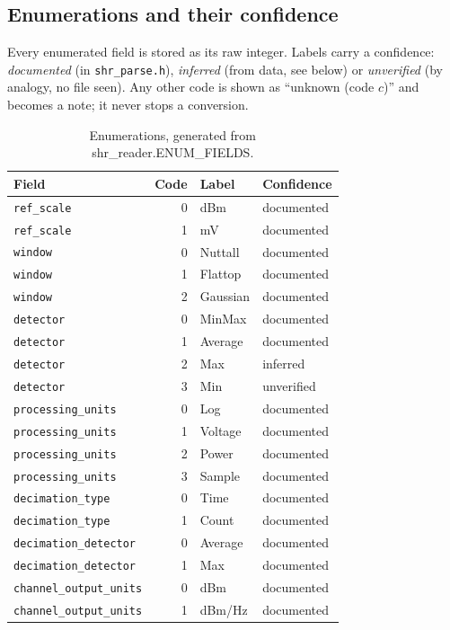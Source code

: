 \documentclass[11pt,a4paper]{article}
\newcommand{\code}[1]{\texttt{#1}}
\begin{document}
\subsection{Enumerations and their confidence}
Every enumerated field is stored as its raw integer. Labels carry a confidence: \emph{documented} (in
\code{shr\_parse.h}), \emph{inferred} (from data, see below) or \emph{unverified} (by analogy, no file seen).
Any other code is shown as ``unknown (code $c$)'' and becomes a note; it never stops a conversion.
\begin{longtable}{p{4.2cm}rp{4.4cm}l}
\caption{Enumerations, generated from shr\_reader.ENUM\_FIELDS.}\\
\toprule
\textbf{Field} & \textbf{Code} & \textbf{Label} & \textbf{Confidence}\\
\midrule
\endhead
\texttt{ref\_\allowbreak{}scale} & 0 & dBm & documented\\
\texttt{ref\_\allowbreak{}scale} & 1 & mV & documented\\
\texttt{window} & 0 & Nuttall & documented\\
\texttt{window} & 1 & Flattop & documented\\
\texttt{window} & 2 & Gaussian & documented\\
\texttt{detector} & 0 & MinMax & documented\\
\texttt{detector} & 1 & Average & documented\\
\texttt{detector} & 2 & Max & inferred\\
\texttt{detector} & 3 & Min & unverified\\
\texttt{processing\_\allowbreak{}units} & 0 & Log & documented\\
\texttt{processing\_\allowbreak{}units} & 1 & Voltage & documented\\
\texttt{processing\_\allowbreak{}units} & 2 & Power & documented\\
\texttt{processing\_\allowbreak{}units} & 3 & Sample & documented\\
\texttt{decimation\_\allowbreak{}type} & 0 & Time & documented\\
\texttt{decimation\_\allowbreak{}type} & 1 & Count & documented\\
\texttt{decimation\_\allowbreak{}detector} & 0 & Average & documented\\
\texttt{decimation\_\allowbreak{}detector} & 1 & Max & documented\\
\texttt{channel\_\allowbreak{}output\_\allowbreak{}units} & 0 & dBm & documented\\
\texttt{channel\_\allowbreak{}output\_\allowbreak{}units} & 1 & dBm/Hz & documented\\
\bottomrule
\end{longtable}
\end{document}
